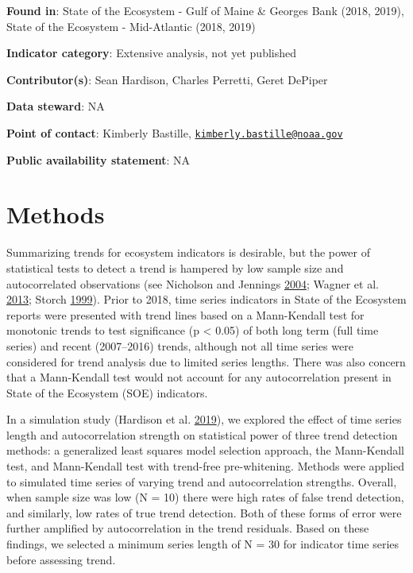 \documentclass[
]{book}
\begin{document}
\textbf{Found in}: State of the Ecosystem - Gulf of Maine \& Georges Bank (2018, 2019), State of the Ecosystem - Mid-Atlantic (2018, 2019)

\textbf{Indicator category}: Extensive analysis, not yet published

\textbf{Contributor(s)}: Sean Hardison, Charles Perretti, Geret DePiper

\textbf{Data steward}: NA

\textbf{Point of contact}: Kimberly Bastille, \href{mailto:kimberly.bastille@noaa.gov}{\nolinkurl{kimberly.bastille@noaa.gov}}

\textbf{Public availability statement}: NA

\hypertarget{methods-42}{%
\section{Methods}\label{methods-42}}

Summarizing trends for ecosystem indicators is desirable, but the power of statistical tests to detect a trend is hampered by low sample size and autocorrelated observations (see Nicholson and Jennings \protect\hyperlink{ref-Nicholson2004}{2004}; Wagner et al. \protect\hyperlink{ref-Wagner2013}{2013}; Storch \protect\hyperlink{ref-VonStorch1999a}{1999}). Prior to 2018, time series indicators in State of the Ecosystem reports were presented with trend lines based on a Mann-Kendall test for monotonic trends to test significance (p \textless{} 0.05) of both long term (full time series) and recent (2007--2016) trends, although not all time series were considered for trend analysis due to limited series lengths. There was also concern that a Mann-Kendall test would not account for any autocorrelation present in State of the Ecosystem (SOE) indicators.

In a simulation study (Hardison et al. \protect\hyperlink{ref-hardison2019}{2019}), we explored the effect of time series length and autocorrelation strength on statistical power of three trend detection methods: a generalized least squares model selection approach, the Mann-Kendall test, and Mann-Kendall test with trend-free pre-whitening. Methods were applied to simulated time series of varying trend and autocorrelation strengths. Overall, when sample size was low (N = 10) there were high rates of false trend detection, and similarly, low rates of true trend detection. Both of these forms of error were further amplified by autocorrelation in the trend residuals. Based on these findings, we selected a minimum series length of N = 30 for indicator time series before assessing trend.
\end{document}
